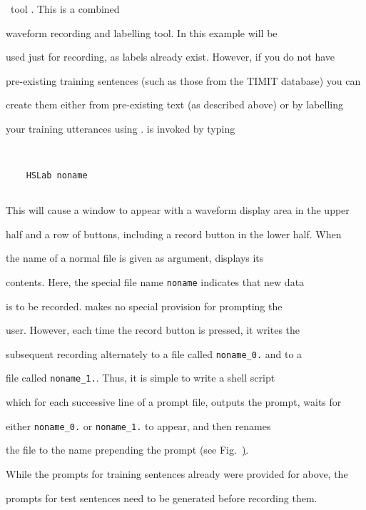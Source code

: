 \HTK\ tool . This is a combined 


waveform recording and labelling tool. In this example  will be


used just for recording, as labels already exist. However, if you do not have


pre-existing training sentences (such as those from the TIMIT database) you can


create them either from pre-existing text (as described above) or by labelling


your training utterances using .  is invoked by typing


\begin{verbatim}


    HSLab noname


\end{verbatim}


This will cause a window to appear with a waveform display area in the upper


half and a row of buttons, including a record button in the lower half.  When


the name of a normal file is given as argument,  displays its


contents.  Here, the special file name \texttt{noname} indicates that new data


is to be recorded.  makes no special provision for prompting the


user.  However, each time the record button is pressed, it writes the


subsequent recording alternately to a file called \verb|noname_0.| and to a


file called \verb|noname_1.|.  Thus, it is simple to write a shell script


which for each successive line of a prompt file, outputs the prompt, waits for


either \verb|noname_0.| or \verb|noname_1.| to appear, and then renames


the file to the name prepending the prompt (see Fig.~\href{f:step3}).







While the prompts for training sentences already were provided for above, the


prompts for test sentences need to be generated before recording them. 


